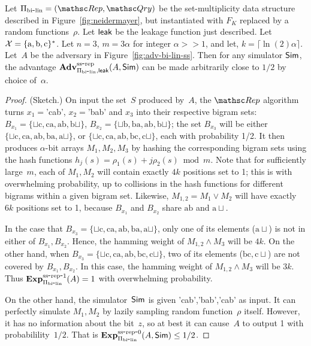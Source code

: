 \begin{theorem}\label{thm:bi-lin-ss}
Let $\Pi_{\bilin}= (\Rep, \Qry)$ be the set-multiplicity data structure described in Figure~\ref{fig:neidermayer}, but instantiated with $F_{K}$ replaced by a random functions~$\rho$.  Let ${\sf leak}$ be the leakage function just described.   Let~${\cal X}=\{\mathrm{a,b,c}\}^*$. Let $n=3$,  $m=3\alpha $ for integer $\alpha >> 1$, and let, $k = \lceil \ln(2) \alpha \rceil$.  Let~$A$ be the adversary in Figure~\ref{fig:adv-bi-lin-ss}.  Then for any simulator ${\sf Sim}$, the advantage $\mathrm{\mathbf{Adv}}^{\mathrm{ss\mbox{-}rep}}_{\Pi_{\mathrm{bi}\mbox{-}\mathrm{lin}},{\sf leak}}(A,{\sf Sim})$ can be made arbitrarily close to $1/2$ by choice of~$\alpha$.

\end{theorem}
\begin{proof}(Sketch.)
On input the set~$S$ produced by~$A$, the $\Rep$ algorithm turns $x_1=$'cab', $x_2=$'bab' and $x_3$ into their respective bigram sets: $B_{x_1}=\{\sqcup\mathrm{c},\mathrm{ca},\mathrm{ab},\mathrm{b}\sqcup\}$, $B_{x_2}=\{\sqcup\mathrm{b},\mathrm{ba},\mathrm{ab}, \mathrm{b}\sqcup \}$; the set $B_{x_3}$ will be either $\{\sqcup\mathrm{c},\mathrm{ca},\mathrm{ab},\mathrm{ba}, \mathrm{a}\sqcup\}$, or $\{\sqcup\mathrm{c},\mathrm{ca},\mathrm{ab},\mathrm{bc}, \mathrm{c}\sqcup\}$, each with probability 1/2.  It then produces $\alpha$-bit arrays $M_1, M_2, M_3$ by hashing the corresponding bigram sets using the hash functions $h_j(s)=\rho_1(s)+ j\rho_2(s) \bmod m$.  Note that for sufficiently large~$m$, each of $M_1,M_2$ will contain exactly $4k$ positions set to 1; this is with overwhelming probability, up to collisions in the hash functions for different bigrams within a given bigram set.  Likewise, $M_{1,2}=M_1 \vee M_2$ will have exactly $6k$ positions set to 1, because $B_{x_1}$ and $B_{x_2}$ share $\mathrm{ab}$ and $\mathrm{a}\sqcup$.

In the case that $B_{x_3}=\{\sqcup\mathrm{c},\mathrm{ca},\mathrm{ab},\mathrm{ba}, \mathrm{a}\sqcup\}$, only one of its elements ($\mathrm{a}\sqcup$) is not in either of $B_{x_1},B_{x_2}$.  Hence, the hamming weight of $M_{1,2}\wedge M_3$ will be $4k$.  On the other hand, when $B_{x_3} = \{\sqcup\mathrm{c},\mathrm{ca},\mathrm{ab},\mathrm{bc}, \mathrm{c}\sqcup\}$, two of its elements ($\mathrm{bc}, \mathrm{c}\sqcup$) are not covered by $B_{x_1},B_{x_2}$.  In this case, the hamming weight of $M_{1,2} \wedge M_3$ will be $3k$.  Thus $\mathrm{\mathbf{Exp}}^{\mathrm{ss\mbox{-}rep\mbox{-}1}}_{\Pi_{\mathrm{bi}\mbox{-}\mathrm{lin}}}(A)=1$ with overwhelming probability.  

On the other hand, the simulator~${\sf Sim}$ is given 'cab','bab','cab' as
input.  It can perfectly simulate $M_1,M_2$ by lazily sampling random
function~$\rho$ itself.  However, it has no information about the
bit~$z$, so at best it can cause~$A$ to output 1 with
probabilility~$1/2$.  That is $\mathrm{\mathbf{Exp}}^{\mathrm{ss\mbox{-}rep\mbox{-}0}}_{\Pi_{\mathrm{bi}\mbox{-}\mathrm{lin}}}(A,{\sf Sim}) \leq 1/2$.
\end{proof}


